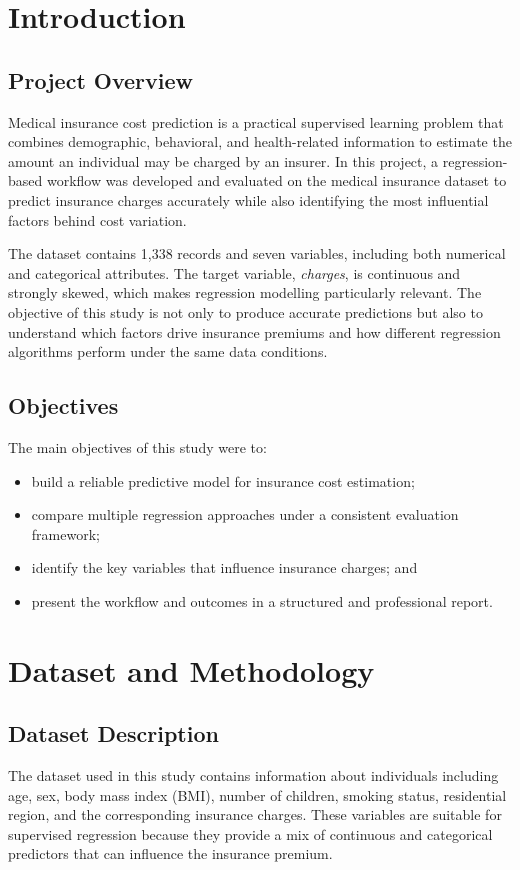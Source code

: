 
\chapter{Introduction}
\section{Project Overview}
Medical insurance cost prediction is a practical supervised learning problem that combines demographic, behavioral, and health-related information to estimate the amount an individual may be charged by an insurer. In this project, a regression-based workflow was developed and evaluated on the medical insurance dataset to predict insurance charges accurately while also identifying the most influential factors behind cost variation.

The dataset contains 1,338 records and seven variables, including both numerical and categorical attributes. The target variable, \textit{charges}, is continuous and strongly skewed, which makes regression modelling particularly relevant. The objective of this study is not only to produce accurate predictions but also to understand which factors drive insurance premiums and how different regression algorithms perform under the same data conditions.

\section{Objectives}
The main objectives of this study were to:
\begin{itemize}
  \item build a reliable predictive model for insurance cost estimation;
  \item compare multiple regression approaches under a consistent evaluation framework;
  \item identify the key variables that influence insurance charges; and
  \item present the workflow and outcomes in a structured and professional report.
\end{itemize}

\chapter{Dataset and Methodology}
\section{Dataset Description}
The dataset used in this study contains information about individuals including age, sex, body mass index (BMI), number of children, smoking status, residential region, and the corresponding insurance charges. These variables are suitable for supervised regression because they provide a mix of continuous and categorical predictors that can influence the insurance premium.

